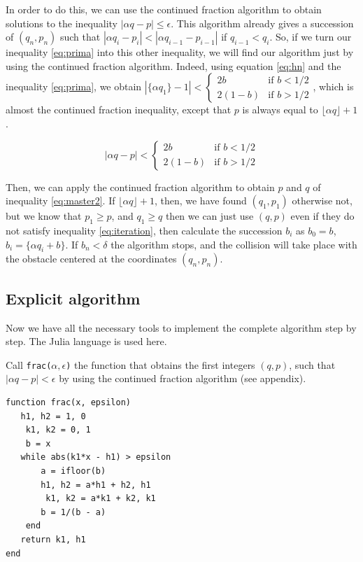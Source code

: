 \documentclass[prl,amsmath,amssymb, twocolumn, showpacs]{revtex4-1}
\begin{document}
In order to do this, we can use the continued fraction algorithm to obtain solutions to the inequality $|\alpha q - p|\leq \epsilon$. This algorithm already gives a succession of $(q_n,p_n)$ such that $|\alpha q_i - p_i|<|\alpha q_{i-1} - p_{i-1}|$ if $q_{i-1} <q_i$. So, if we turn our inequality \ref{eq:prima} into this other inequality, we will find our algorithm just by using the continued fraction algorithm.
Indeed, using equation \ref{eq:hn} and the inequality \ref{eq:prima}, we obtain $|\{ \alpha  q_1 \} -1|< \begin{cases} 2b &\mbox{if } b < 1/2 \\  2(1-b) & \mbox{if } b > 1/2 \end{cases} $, which is almost the continued fraction inequality, except that $p$ is always equal to $\lfloor \alpha q  \rfloor+1$. 

\begin{equation}
|\alpha  q-p|< \begin{cases} 2b &\mbox{if } b < 1/2 \\  2(1-b) & \mbox{if } b > 1/2 \end{cases}
\label{eq:master2}
\end{equation}

Then, we can apply the continued fraction algorithm to obtain $p$ and $q$ of inequality \ref{eq:master2}. If $\lfloor \alpha q  \rfloor+1$, then, we have found $(q_1,p_1)$ otherwise not, but we know that $p_1\geq p$, and $q_1 \geq q$ then we can just use $(q, p)$ even if they do not satisfy inequality \ref{eq:iteration}, then calculate the succession $b_i$ as $b_0=b$, $b_i=\{\alpha q_i+b\}$. If $b_n<\delta$ the algorithm stops, and the collision will take place with the obstacle centered at the coordinates $(q_n,p_n)$. 

\subsection{Explicit algorithm}

Now we have all the necessary tools to implement the complete algorithm step by step. The Julia language is used here.

Call \texttt{frac($\alpha, \epsilon$)} the function that obtains the first integers $(q,p)$, such that $|\alpha q-p|<\epsilon$ by using the continued fraction algorithm (see appendix). 

\begin{verbatim}
function frac(x, epsilon) 
   h1, h2 = 1, 0 
    k1, k2 = 0, 1 
    b = x 
   while abs(k1*x - h1) > epsilon 
       a = ifloor(b) 
       h1, h2 = a*h1 + h2, h1 
        k1, k2 = a*k1 + k2, k1 
       b = 1/(b - a) 
    end 
   return k1, h1 
end
\end{verbatim}
\end{document}
